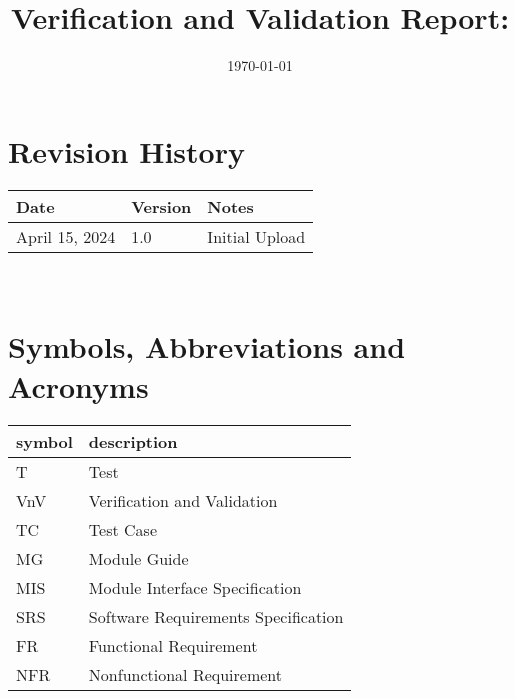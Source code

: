 \documentclass[12pt, titlepage]{article}
\begin{document}
\title{Verification and Validation Report: \progname} 
\author{\authname}
\date{\today}
	
\maketitle


\section{Revision History}

\begin{tabularx}{\textwidth}{p{3cm}p{2cm}X}
\toprule {\bf Date} & {\bf Version} & {\bf Notes}\\
\midrule
April 15, 2024 & 1.0 & Initial Upload\\

\bottomrule
\end{tabularx}

~\newpage

\section{Symbols, Abbreviations and Acronyms}

\renewcommand{\arraystretch}{1.2}
\begin{tabular}{l l} 
  \toprule		
  \textbf{symbol} & \textbf{description}\\
  \midrule 
  T & Test\\
  VnV & Verification and Validation \\
  TC & Test Case\\
  MG & Module Guide\\
  MIS & Module Interface Specification\\
  SRS & Software Requirements Specification\\
  FR & Functional Requirement\\
  NFR & Nonfunctional Requirement\\
  \bottomrule
\end{tabular}\\


\newpage

\tableofcontents

\listoftables %

\listoffigures %
\end{document}
